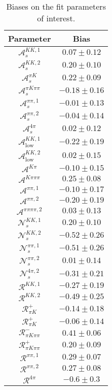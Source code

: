 \begin{table}
  \centering
  \begin{tabular}{cc}
  \toprule
      Parameter & Bias \\
  \midrule
      $\mathcal{A}_s^{KK,1}$ & $0.07 \pm 0.12$ \\
      $\mathcal{A}_s^{KK,2}$ & $0.20 \pm 0.10$ \\
      $\mathcal{A}_s^{\pi K}$ & $0.22 \pm 0.09$ \\
      $\mathcal{A}_s^{\pi K\pi\pi}$ & $-0.18 \pm 0.16$ \\
      $\mathcal{A}_s^{\pi\pi,1}$ & $-0.01 \pm 0.13$ \\
      $\mathcal{A}_s^{\pi\pi,2}$ & $-0.04 \pm 0.14$ \\
      $\mathcal{A}_s^{4\pi}$ & $0.02 \pm 0.12$ \\
      $\mathcal{A}_\mathrm{low}^{KK,1}$ & $-0.22 \pm 0.19$ \\
      $\mathcal{A}_\mathrm{low}^{KK,2}$ & $0.02 \pm 0.15$ \\
      $\mathcal{A}^{K\pi}$ & $-0.10 \pm 0.15$ \\
      $\mathcal{A}^{K\pi\pi\pi}$ & $0.25 \pm 0.08$ \\
      $\mathcal{A}^{\pi\pi,1}$ & $-0.10 \pm 0.17$ \\
      $\mathcal{A}^{\pi\pi,2}$ & $-0.20 \pm 0.19$ \\
      $\mathcal{A}^{\pi\pi\pi\pi,2}$ & $0.03 \pm 0.13$ \\
      $\mathcal{N}_s^{KK,1}$ & $0.20 \pm 0.10$ \\
      $\mathcal{N}_s^{KK,2}$ & $-0.52 \pm 0.26$ \\
      $\mathcal{N}_s^{\pi\pi,1}$ & $-0.51 \pm 0.26$ \\
      $\mathcal{N}_s^{\pi\pi,2}$ & $0.01 \pm 0.14$ \\
      $\mathcal{N}_s^{4\pi,2}$ & $-0.31 \pm 0.21$ \\
      $\mathcal{R}^{KK,1}$ & $-0.27 \pm 0.19$ \\
      $\mathcal{R}^{KK,2}$ & $-0.49 \pm 0.25$ \\
      $\mathcal{R}_{\pi K}^+$ & $-0.14 \pm 0.18$ \\
      $\mathcal{R}_{\pi K}^+$ & $-0.06 \pm 0.14$ \\
      $\mathcal{R}_{\pi K\pi\pi}^-$ & $0.41 \pm 0.06$ \\
      $\mathcal{R}_{\pi K\pi\pi}^+$ & $0.20 \pm 0.09$ \\
      $\mathcal{R}^{\pi\pi,1}$ & $0.29 \pm 0.07$ \\
      $\mathcal{R}^{\pi\pi,2}$ & $0.27 \pm 0.08$ \\
      $\mathcal{R}^{4\pi}$ & $-0.6 \pm 0.3$ \\
      \bottomrule
  \end{tabular}
  \caption{Biases on the fit parameters of interest.}
\label{tab:biases}
\end{table}
